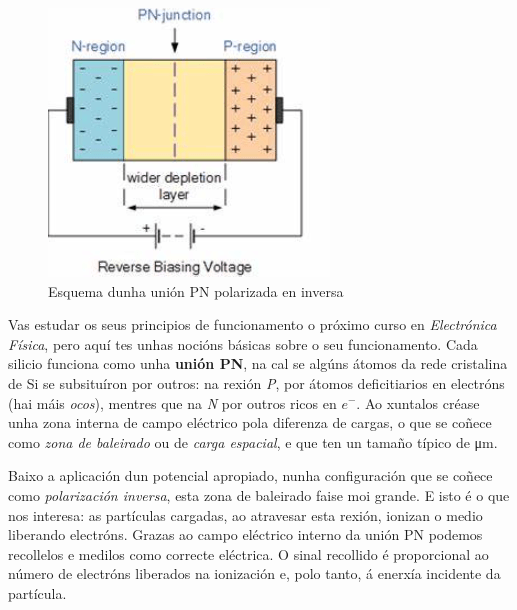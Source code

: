 \documentclass[11pt, a4paper]{article}
\begin{document}
\begin{figure}
    \begin{center}
    \includegraphics[width=0.7\linewidth]{figures/pn_junction.png}
    \end{center}
    \caption{Esquema dunha unión PN polarizada en inversa}
\end{figure}
Vas estudar os seus principios de funcionamento o próximo curso en \textit{Electrónica Física}, pero aquí tes unhas nocións básicas sobre o seu funcionamento. Cada silicio funciona como unha \textbf{unión PN}, na cal se algúns átomos da rede cristalina de Si se subsituíron por outros: na rexión \textit{P}, por átomos deficitiarios en electróns (hai máis \textit{ocos}), mentres que na \textit{N} por outros ricos en $e^-$. Ao xuntalos créase unha zona interna de campo eléctrico pola diferenza de cargas, o que se coñece como \textit{zona de baleirado} ou de \textit{carga espacial}, e que ten un tamaño típico de \unit{\micro\m}.

Baixo a aplicación dun potencial apropiado, nunha configuración que se coñece como \textit{polarización inversa}, esta zona de baleirado faise moi grande. E isto é o que nos interesa: as partículas cargadas, ao atravesar esta rexión, ionizan o medio liberando electróns. Grazas ao campo eléctrico interno da unión PN podemos recollelos e medilos como correcte eléctrica. O sinal recollido é proporcional ao número de electróns liberados na ionización e, polo tanto, á enerxía incidente da partícula.
\end{document}
